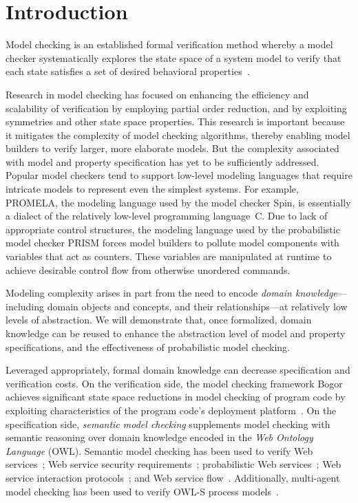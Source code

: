 \section{Introduction}

\noindent Model checking is an established formal verification method whereby a model checker systematically explores the state space of a system model to verify that each state satisfies a set of desired behavioral properties~\cite{Baier_2008}.

Research in model checking has focused on enhancing the efficiency and scalability of verification by employing partial order reduction, and by exploiting symmetries and other state space properties. This research is important because it mitigates the complexity of model checking algorithms, thereby enabling model builders to verify larger, more elaborate models. But the complexity associated with model and property specification has yet to be sufficiently addressed. Popular model checkers tend to support low-level modeling languages that require intricate models to represent even the simplest systems. For example, PROMELA, the modeling language used by the model checker Spin, is essentially a dialect of the relatively low-level programming language~C\@. Due to lack of appropriate control structures, the modeling language used by the probabilistic model checker PRISM forces model builders to pollute model components with variables that act as counters. These variables are manipulated at runtime to achieve desirable control flow from otherwise unordered commands.

Modeling complexity arises in part from the need to encode \emph{domain knowledge}---including domain objects and concepts, and their relationships---at relatively low levels of abstraction. We will demonstrate that, once formalized, domain knowledge can be reused to enhance the abstraction level of model and property specifications, and the effectiveness of probabilistic model checking.

Leveraged appropriately, formal domain knowledge can decrease specification and verification costs. On the verification side, the model checking framework Bogor achieves significant state space reductions in model checking of program code by exploiting characteristics of the program code's deployment platform~\cite{Robby_2003}. On the specification side, \emph{semantic model checking} supplements model checking with semantic reasoning over domain knowledge encoded in the \emph{Web Ontology Language} (OWL). Semantic model checking has been used to verify Web services~\cite{Narayanan_2002,Di_Pietro_2012}; Web service security requirements~\cite{Boaro_2010}; probabilistic Web services~\cite{Oghabi_2011}; Web service interaction protocols~\cite{Ankolekar_2005}; and Web service flow~\cite{Liu_2008}. Additionally, multi-agent model checking has been used to verify OWL-S process models~\cite{Lomuscio_2009}.


